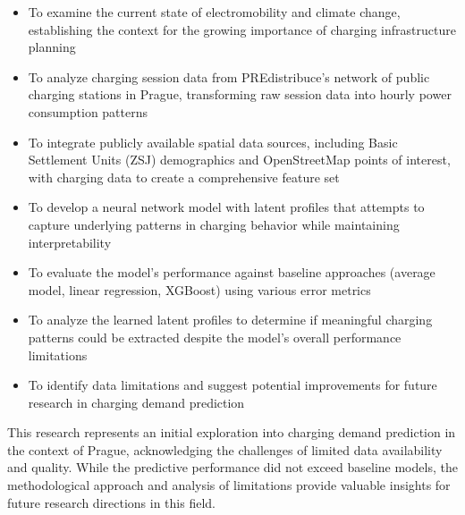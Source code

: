 \begin{itemize}
    \item To examine the current state of electromobility and climate change, establishing the context for the growing importance of charging infrastructure planning

    \item To analyze charging session data from PREdistribuce's network of public charging stations in Prague, transforming raw session data into hourly power consumption patterns

    \item To integrate publicly available spatial data sources, including Basic Settlement Units (ZSJ) demographics and OpenStreetMap points of interest, with charging data to create a comprehensive feature set

    \item To develop a neural network model with latent profiles that attempts to capture underlying patterns in charging behavior while maintaining interpretability

    \item To evaluate the model's performance against baseline approaches (average model, linear regression, XGBoost) using various error metrics

    \item To analyze the learned latent profiles to determine if meaningful charging patterns could be extracted despite the model's overall performance limitations

    \item To identify data limitations and suggest potential improvements for future research in charging demand prediction
\end{itemize}

This research represents an initial exploration into charging demand prediction in the context of Prague, acknowledging the challenges of limited data availability and quality. While the predictive performance did not exceed baseline models, the methodological approach and analysis of limitations provide valuable insights for future research directions in this field.
